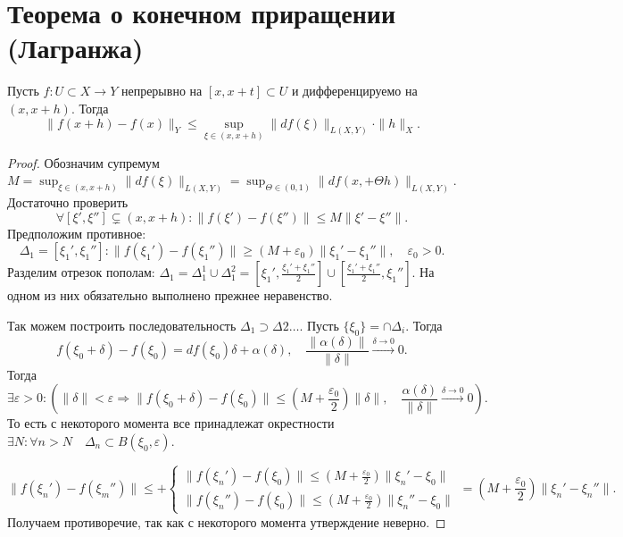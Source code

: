 \section{Теорема о конечном приращении (Лагранжа)}
\begin{thm}
    Пусть $ f \colon U \subset X \to  Y$ непрерывно на $ [x, x+t] \subset U$ и дифференцируемо на $ (x, x+h)$. Тогда
     \[
	 \| f(x+h) - f(x) \|_Y \le \sup_{\xi \in (x, x+h)} \| df(\xi) \|_{L(X, Y)} \cdot \| h \|_X 
    .\] 
\end{thm}
\begin{proof}
    Обозначим супремум $ M = \sup_{\xi \in (x, x+h)} \| df(\xi) \| _{L(X, Y)} = \sup_{ \Theta \in (0, 1)} \| df(x, + \Theta h) \|_{L(X,Y)} $.
	Достаточно  проверить
    \[
	\forall [\xi' , \xi''] \subsetneq (x, x+h) \colon \| f(\xi') - f(\xi'') \| \le M \| \xi'-\xi'' \| 
    .\] 
    Предположим противное:
    \[
	\Delta_1 = [\xi_1' , \xi_1''] \colon \| f( \xi_1') - f(\xi_1'')  \| \ge (M + \varepsilon_0) \| \xi_1' -\xi_1'' \| , \quad \varepsilon_0 > 0 
    .\] 
    Разделим отрезок пополам: $ \Delta_1 = \Delta_1^{1} \cup \Delta_1^{2} = [\xi_1' , \frac{\xi_1' + \xi_1''}{2}] \cup  [\frac{\xi_1' + \xi_1''}{2}, \xi_1'']$. На одном из них обязательно выполнено прежнее неравенство.

    Так можем построить последовательность $ \Delta_1 \supset \Delta 2 \ldots  $.
    Пусть $ \{ \xi_0\} = \cap \Delta_i$. Тогда
    \[
	f(\xi_0 + \delta ) - f(\xi_0) = df( \xi_0) \delta  + \alpha (\delta), \quad \frac{ \| \alpha ( \delta ) \| }{\| \delta  \| } \stackrel{ \delta  \to  0}{\to}  0
    .\] 
    Тогда 
    \[
	\exists  \varepsilon >0 \colon \left( \| \delta  \| < \varepsilon  \Longrightarrow \| f( \xi_0 + \delta ) - f(\xi_0) \| \le \left(M + \frac{ \varepsilon_0}{2}\right) \|  \delta  \| , \quad \frac{ \alpha ( \delta )}{\| \delta  \| } \stackrel{ \delta  \to  0}{ \to }  0\right) 
    .\] 
    То есть с некоторого момента все принадлежат окрестности $ \exists N \colon \forall n > N \quad \Delta_n \subset B( \xi_0, \varepsilon ) $.

    \[
	\| f(\xi_n')-f(\xi_m'') \| \le + 
	\begin{cases}
	    \| f( \xi_n') - f( \xi_0) \| \le \left( M+ \frac{ \varepsilon_0}{2} \right) \|  \xi_n' - \xi_0 \| \\  
	    \| f( \xi_n'') - f( \xi_0) \| \le \left( M+ \frac{ \varepsilon_0}{2} \right) \|  \xi_n'' - \xi_0 \|  
	\end{cases}
	= \left( M + \frac{ \varepsilon_0}{ 2} \right) \| \xi_n' - \xi_n'' \| 
    .\] 
    Получаем противоречие, так как с некоторого момента утверждение неверно.
\end{proof}
